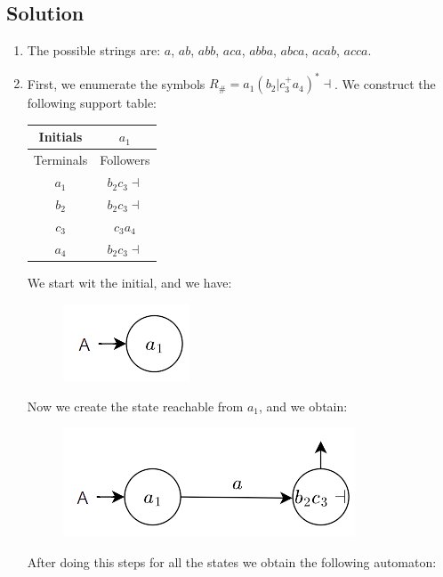 \documentclass[12pt, a4paper]{report}
\newtheorem[style=M, bodystyle=\normalfont]{theorem}{Theorem}
\newtheorem[style=M, bodystyle=\normalfont]{corollary}{Corollary}
\newtheorem[style=M, bodystyle=\normalfont]{lemma}{Lemma}
\newtheorem[style=M, bodystyle=\normalfont]{definition}{Definition}
\begin{document}
    \subsection*{Solution}
    \begin{enumerate}
        \item The possible strings are: $a$, $ab$, $abb$, $aca$, $abba$, $abca$, $acab$, $acca$. 
        \item First, we enumerate the symbols $R_{\#}=a_1\left( b_2|c^{+}_{3}a_4 \right)^{*}\dashv$. We construct the following support table: 
            \begin{table}[H]
                \centering
                \begin{tabular}{cc}
                Initials                       & $a_1$             \\ \hline
                \multicolumn{1}{c|}{Terminals} & Followers         \\
                \multicolumn{1}{c|}{$a_1$}     & $b_2c_3\dashv$ \\
                \multicolumn{1}{c|}{$b_2$}     & $b_2c_3\dashv$  \\
                \multicolumn{1}{c|}{$c_3$}     & $c_3a_4$         \\
                \multicolumn{1}{c|}{$a_4$}     & $b_2c_3\dashv$ 
                \end{tabular}
            \end{table}
            We start wit the initial, and we have: 
            \begin{figure}[H]
                \centering
                \includegraphics[width=0.2\linewidth]{images/FSA1.png}
            \end{figure}
            Now we create the state reachable from $a_1$, and we obtain: 
            \begin{figure}[H]
                \centering
                \includegraphics[width=0.4\linewidth]{images/FSA2.png}
            \end{figure}
            After doing this steps for all the states we obtain the following automaton: 

\end{enumerate}
\end{document}
